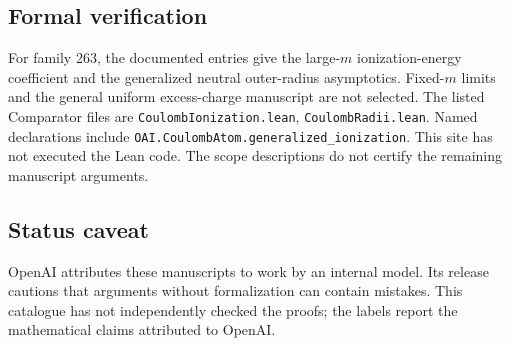 \documentclass[11pt]{article}
\begin{document}
\subsection{Formal verification}
For family 263, the documented entries give the large-$m$ ionization-energy coefficient and the generalized neutral outer-radius asymptotics. Fixed-$m$ limits and the general uniform excess-charge manuscript are not selected. The listed Comparator files are \texttt{CoulombIonization.lean}, \texttt{CoulombRadii.lean}. Named declarations include \texttt{OAI.CoulombAtom.generalized\_ionization}. This site has not executed the Lean code. The scope descriptions do not certify the remaining manuscript arguments.

\subsection{Status caveat}
OpenAI attributes these manuscripts to work by an internal model. Its release cautions that arguments without formalization can contain mistakes. This catalogue has not independently checked the proofs; the labels report the mathematical claims attributed to OpenAI.
\end{document}
